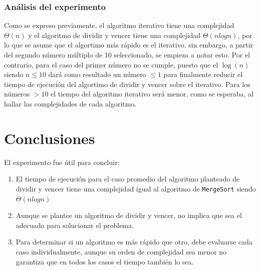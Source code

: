 \documentclass[letter]{article}
\begin{document}
\subsubsection{Análisis del experimento}
\label{experimentos:aleatorias:analisis}
Como se expreso previamente, el algoritmo iterativo tiene una complejidad $\Theta(n)$ y el algoritmo de dividir y vencer tiene una complejidad $\Theta(nlogn)$, por lo que se asume que el algortimo más rápido es el iterativo, sin embargo, a partir del segundo número múltiplo de 10 seleccionado, se empieza a notar esto. Por el contrario, para el caso del primer número no se cumple, puesto que el $\log(n)$ siendo $n \leq 10$ dará como resultado un número $\leq 1$ para finalmente reducir el tiempo de ejecución del algortimo de dividir y vencer sobre el iterativo. Para los números $> 10$ el tiempo del algoritmo iterativo será menor, como se esperaba, al hallar las complejidades de cada algoritmo. 

\section{Conclusiones}
El experimento fue útil para concluir:
\begin{enumerate}
    \item El tiempo de ejecución para el caso promedio del algoritmo planteado de dividir y vencer tiene una complejidad igual al algoritmo de \texttt{MergeSort} siendo $\Theta(nlogn)$ 
    \item Aunque se plantee un algoritmo de dividir y vencer, no implica que sea el adecuado para solucionar el problema.
    \item Para determinar si un algoritmo es más rápido que otro, debe evaluarse cada caso individualmente, aunque su orden de complejidad sea menor no garantiza que en todos los casos el tiempo también lo sea. 
\end{enumerate}
\end{document}
